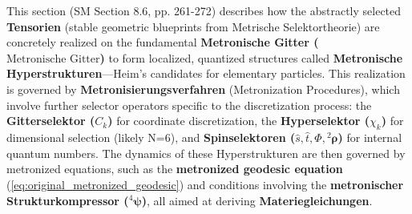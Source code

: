 \documentclass[12pt]{article}
\newcommand{\metronischegitter}{\text{Metronische Gitter}}
\newcommand{\metronischerstrukturkompressor}{{}^4\bm{\psi}}
\begin{document}
This section (SM Section 8.6, pp. 261-272) describes how the abstractly selected \textbf{Tensorien} (stable geometric blueprints from Metrische Selektortheorie) are concretely realized on the fundamental \textbf{Metronische Gitter (\(\metronischegitter\))} to form localized, quantized structures called \textbf{Metronische Hyperstrukturen}—Heim's candidates for elementary particles. This realization is governed by \textbf{Metronisierungsverfahren} (Metronization Procedures), which involve further selector operators specific to the discretization process: the \textbf{Gitterselektor (\(C_k\))} for coordinate discretization, the \textbf{Hyperselektor (\(\chi_k\))} for dimensional selection (likely N=6), and \textbf{Spinselektoren (\(\hat{s}, \hat{t}, \hat{\Phi}, {}^2\bm{\rho}\))} for internal quantum numbers. The dynamics of these Hyperstrukturen are then governed by metronized equations, such as the \textbf{metronized geodesic equation} (\eqref{eq:original_metronized_geodesic}) and conditions involving the \textbf{metronischer Strukturkompressor (\(\metronischerstrukturkompressor\))}, all aimed at deriving \textbf{Materiegleichungen}.
\end{document}
